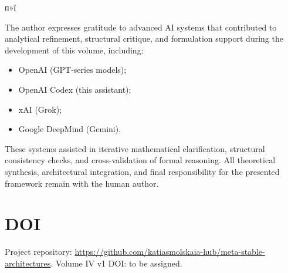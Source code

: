 ﻿п»ї\documentclass[12pt,a4paper]{article}
\begin{document}
The author expresses gratitude to advanced AI systems that contributed to analytical refinement, structural critique, and formulation support during the development of this volume, including:
\begin{itemize}
    \item OpenAI (GPT-series models);
    \item OpenAI Codex (this assistant);
    \item xAI (Grok);
    \item Google DeepMind (Gemini).
\end{itemize}
These systems assisted in iterative mathematical clarification, structural consistency checks, and cross-validation of formal reasoning. All theoretical synthesis, architectural integration, and final responsibility for the presented framework remain with the human author.



\section*{DOI}
Project repository: \href{https://github.com/katiasmolskaia-hub/meta-stable-architectures}{https://github.com/katiasmolskaia-hub/meta-stable-architectures}.
Volume IV v1 DOI: to be assigned.
\end{document}
